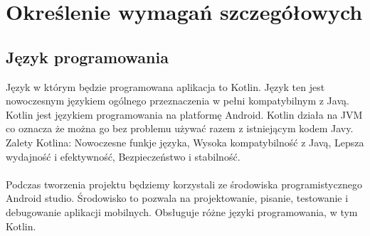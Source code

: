 \newpage
\section{Określenie wymagań szczegółowych}		%

\subsection{\large{Język programowania}}
\hspace*{1em}Język w którym będzie programowana aplikacja to Kotlin. Język ten jest nowoczesnym językiem ogólnego przeznaczenia w pełni kompatybilnym z Javą. Kotlin jest językiem programowania na platformę Android. Kotlin działa na JVM co oznacza że można go bez problemu używać razem z istniejącym kodem Javy. Zalety Kotlina: Nowoczesne funkje języka, Wysoka kompatybilność z Javą, Lepsza wydajność i efektywność, Bezpieczeństwo i stabilność.\\
\\
\hspace*{1em}Podczas tworzenia projektu będziemy korzystali ze środowiska programistycznego Android studio. Środowisko to pozwala na projektowanie, pisanie, testowanie i debugowanie aplikacji mobilnych. Obsługuje różne języki programowania, w tym Kotlin.

\newpage
